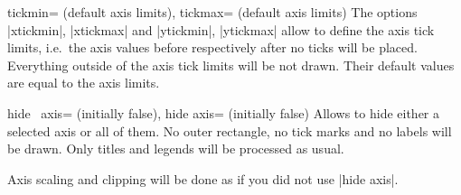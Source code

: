 \begin{pgfplotsxykeylist}{\x tickmin= (default axis limits), \x tickmax= (default axis limits)}
\label{key:xytickminmax}
The options |xtickmin|, |xtickmax| and |ytickmin|, |ytickmax| allow to define the axis tick limits, i.e.\ the axis values before respectively after no ticks will be placed.
Everything outside of the axis tick limits will be not drawn.
Their default values are equal to the axis limits.

\begin{codeexample}[]
\end{codeexample}
\end{pgfplotsxykeylist}

\begin{pgfplotsxykeylist}{%
	hide \x\ axis= (initially false),
	hide axis= (initially false)}
Allows to hide either a selected axis or all of them. No outer rectangle, no tick marks and no labels will be drawn. Only titles and legends will be processed as usual.

Axis scaling and clipping will be done as if you did not use |hide axis|.
\begin{codeexample}[]
\end{codeexample}

\begin{codeexample}[]
\end{codeexample}
\end{pgfplotsxykeylist}

